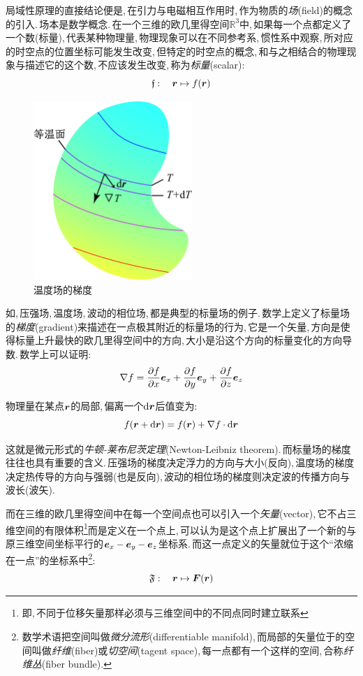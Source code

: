 局域性原理的直接结论便是,\,在引力与电磁相互作用时,\,作为物质的\emph{场}(field)的概念的引入.\,场本是数学概念.\,在一个三维的欧几里得空间\(\mathbb{R}^3\)中,\,如果每一个点都定义了一个数(标量),\,代表某种物理量,\,物理现象可以在不同参考系,\,惯性系中观察,\,所对应的时空点的位置坐标可能发生改变,\,但特定的时空点的概念,\,和与之相结合的物理现象与描述它的这个数,\,不应该发生改变,\,称为\emph{标量}(scalar):
\[\mathfrak{f}:\quad \boldsymbol{r}\mapsto f(\boldsymbol{r})\]
\npg{0cm}
\begin{figure}
\centering
\includegraphics[width=6cm]{image/7-1-3.png}
\caption{温度场的梯度}
\end{figure}
如,\,压强场,\,温度场,\,波动的相位场,\,都是典型的标量场的例子.\,数学上定义了标量场的\emph{梯度}(gradient)来描述在一点极其附近的标量场的行为,\,它是一个矢量,\,方向是使得标量上升最快的欧几里得空间中的方向,\,大小是沿这个方向的标量变化的方向导数.\,数学上可以证明:
\[\nabla f=\frac{\partial f}{\partial x}\boldsymbol{e}_x+\frac{\partial f}{\partial y}\boldsymbol{e}_y+\frac{\partial f}{\partial z}\boldsymbol{e}_z\]

物理量在某点\(\boldsymbol{r}\)的局部,\,偏离一个\(\textrm{d} \boldsymbol{r}\)后值变为:
\[f(\boldsymbol{r}+\textrm{d}\boldsymbol{r})=f(\boldsymbol{r})+\nabla f\cdot\textrm{d} \boldsymbol{r}\]

这就是微元形式的\emph{牛顿-莱布尼茨定理}(Newton-Leibniz theorem).\,而标量场的梯度往往也具有重要的含义.\,压强场的梯度决定浮力的方向与大小(反向),\,温度场的梯度决定热传导的方向与强弱(也是反向),\,波动的相位场的梯度则决定波的传播方向与波长(波矢).

而在三维的欧几里得空间中在每一个空间点也可以引入一个\emph{矢量}(vector),\,它不占三维空间的有限体积\footnote{即,\,不同于位移矢量那样必须与三维空间中的不同点同时建立联系}而是定义在一个点上,\,可以认为是这个点上扩展出了一个新的与原三维空间坐标平行的\(\boldsymbol{e}_x-\boldsymbol{e}_y-\boldsymbol{e}_z\)坐标系.\,而这一点定义的矢量就位于这个``浓缩在一点''的坐标系中\footnote{数学术语把空间叫做\emph{微分流形}(differentiable manifold),\,而局部的矢量位于的空间叫做\emph{纤维}(fiber)或\emph{切空间}(tagent space),\,每一点都有一个这样的空间,\,合称\emph{纤维丛}(fiber bundle).}:
\[\mathfrak{F}:\quad \boldsymbol{r}\mapsto\boldsymbol{F}(\boldsymbol{r})\]

